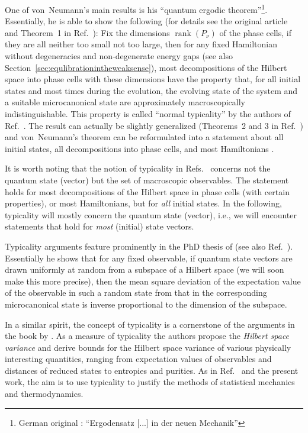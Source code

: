 \documentclass[a4paper,12pt,listof=totoc,index=totoc,bibliography=totoc,headsepline=false,headings=normal,BCOR16.153846mm,DIV12,headinclude,twoside,cleardoublepage=empty,numbers=noenddot,final]{scrreprt}
\theoremstyle{mystyle}
\numberwithin{equation}{section}
\numberwithin{figure}{section}
\numberwithin{lemma}{section}
\numberwithin{theorem}{section}
\numberwithin{corollary}{section}
\numberwithin{definition}{section}
\numberwithin{conjecture}{section}
\numberwithin{observation}{section}
\newcommand{\+}{\mkern2mu}
\DeclareMathOperator{\1}{\mathds{1}}
\DeclareMathOperator{\rank}{rank}
\begin{document}
One of von~Neumann's main results is his ``quantum ergodic theorem''\footnote{German original \cite{vonneumann1929}: \foreignlanguage{ngerman}{``Ergodensatz [...] in der neuen Mechanik''}}.
Essentially, he is able to show the following (for details see the original article and Theorem~1 in Ref.~\cite{0907.0108v1}):
Fix the dimensions $\rank(P_\nu)$ of the phase cells, if they are all neither too small not too large, then for any fixed Hamiltonian without degeneracies and non-degenerate energy gaps (see also Section~\ref{sec:equlibrationintheweaksense}), most decompositions of the Hilbert space into phase cells with these dimensions have the property that, for all initial states and most times during the evolution, the evolving state of the system and a suitable microcanonical state are approximately macroscopically indistinguishable.
This property is called ``normal typicality'' by the authors of Ref.~\cite{0907.0108v1}.
The result can actually be slightly generalized (Theorems~2 and 3 in Ref.~\cite{0907.0108v1}) and von~Neumann's theorem can be reformulated into a statement about all initial states, all decompositions into phase cells, and most Hamiltonians \cite{0907.0108v1}.

It is worth noting that the notion of typicality in Refs.~\cite{vonneumann1929,0907.0108v1} concerns not the quantum state (vector) but the set of macroscopic observables.
The statement holds for most decompositions of the Hilbert space in phase cells (with certain properties), or most Hamiltonians, but for \emph{all} initial states.
In the following, typicality will mostly concern the quantum state (vector), i.e., we will encounter statements that hold for \emph{most} (initial) state vectors.

Typicality arguments feature prominently in the PhD thesis of \textcite{slloydthesis} (see also Ref.~\cite{lloyed13}).
Essentially he shows that for any fixed observable, if quantum state vectors are drawn uniformly at random from a subspace of a Hilbert space (we will soon make this more precise), then the mean square deviation of the expectation value of the observable in such a random state from that in the corresponding microcanonical state is inverse proportional to the dimension of the subspace.

In a similar spirit, the concept of typicality is a cornerstone of the arguments in the book by \textcite{Gemmer09}.
As a measure of typicality the authors propose the \emph{Hilbert space variance} and derive bounds for the Hilbert space variance of various physically interesting quantities, ranging from expectation values of observables and distances of reduced states to entropies and purities.
As in Ref.~\cite{slloydthesis} and the present work, the aim is to use typicality to justify the methods of statistical mechanics and thermodynamics.
\end{document}
